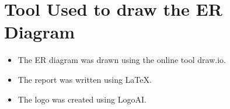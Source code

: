 \section{Tool Used to draw the ER Diagram}

\begin{itemize}
  \item The ER diagram was drawn using the online tool draw.io. \cite{drawio}
  \item The report was written using LaTeX. \cite{latex}
  \item The logo was created using LogoAI. \cite{logo}
\end{itemize}
